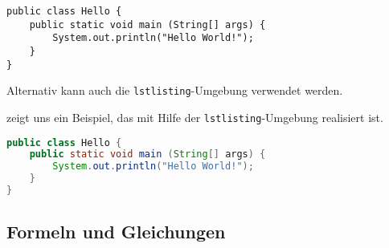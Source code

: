 \documentclass[utf8,biblatex]{lni}
\begin{document}
\begin{verbatim}
public class Hello {
    public static void main (String[] args) {
        System.out.println("Hello World!");
    }
}
\end{verbatim}

Alternativ kann auch die \texttt{lstlisting}-Umgebung verwendet werden.

 zeigt uns ein Beispiel, das mit Hilfe der \texttt{lstlisting}-Umgebung realisiert ist.

\begin{lstlisting}[caption={Beschreibung}, label=L1, language=Java]
public class Hello {
    public static void main (String[] args) {
        System.out.println("Hello World!");
    }
}
\end{lstlisting}

\subsection{Formeln und Gleichungen}


\printbibliography
\end{document}
